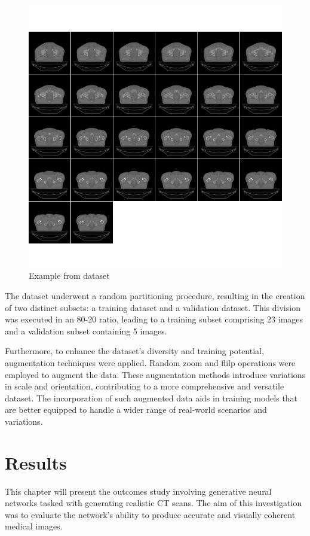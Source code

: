 \documentclass[11pt,a4paper]{report}
\begin{document}
\begin{figure}[H]
	\centering
	\includegraphics[scale=0.5]{images/datasetExample}
    \caption{Example from dataset}
\end{figure}
The dataset underwent a random partitioning procedure, resulting in the creation of two distinct subsets: a training dataset and a validation dataset. This division was executed in an 80-20 ratio, leading to a training subset comprising 23 images and a validation subset containing 5 images.

Furthermore, to enhance the dataset's diversity and training potential, augmentation techniques were applied. Random zoom and flilp operations were employed to augment the data. These augmentation methods introduce variations in scale and orientation, contributing to a more comprehensive and versatile dataset. The incorporation of such augmented data aids in training models that are better equipped to handle a wider range of real-world scenarios and variations.


\chapter{Results}
This chapter will present the outcomes study involving generative neural networks tasked with generating realistic CT scans. The aim of this investigation was to evaluate the network's ability to produce accurate and visually coherent medical images.
\end{document}
